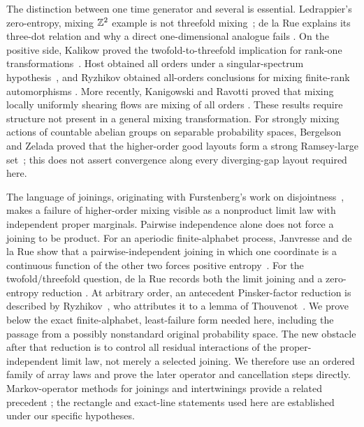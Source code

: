 The distinction between one time generator and several is essential.
Ledrappier's zero-entropy, mixing $\mathbb Z^2$ example is not threefold
mixing~\cite{Ledrappier1978}; de la Rue explains its three-dot relation
and why a direct one-dimensional analogue fails
\cite[Sections~1.2 and~3.4, preprint version]{deLaRue2006}. On the positive side,
Kalikow proved the twofold-to-threefold implication for rank-one
transformations~\cite{Kalikow1984}. Host obtained all orders under a
singular-spectrum hypothesis~\cite{Host1991}, and Ryzhikov obtained
all-orders conclusions for mixing finite-rank automorphisms
\cite{Ryzhikov1993}. More recently, Kanigowski and Ravotti proved
that mixing locally uniformly shearing flows are mixing of all orders
\cite[Theorem~6.8]{KanigowskiRavotti2024}.
These results require structure not present in a general mixing
transformation. For strongly mixing actions of countable abelian groups
on separable probability spaces,
Bergelson and Zelada proved that the higher-order good layouts form a
strong Ramsey-large set~\cite[Theorem~1.11]{BergelsonZelada2024}; this
does not assert convergence along every diverging-gap layout required
here.

The language of joinings, originating with Furstenberg's work on
disjointness~\cite{Furstenberg1967}, makes a failure of higher-order
mixing visible as a nonproduct limit law with independent proper
marginals. Pairwise independence alone does not force a joining to be
product. For an aperiodic finite-alphabet process, Janvresse and
de la Rue show that a pairwise-independent joining in which one
coordinate is a continuous function of the other two forces positive
entropy~\cite{JanvresseDeLaRue2008}.
For the twofold/threefold question, de la Rue records both the limit
joining and a zero-entropy reduction
\cite[Propositions~3.1 and~3.2, preprint version]{deLaRue2006}.
At arbitrary order, an antecedent Pinsker-factor reduction is described
by Ryzhikov~\cite[p.~251]{Ryzhikov1997}, who attributes it to a lemma of
Thouvenot~\cite{Thouvenot1975Pinsker}. We prove below the exact
finite-alphabet, least-failure form needed here, including the passage
from a possibly nonstandard original probability space. The new
obstacle after that reduction is to control all residual interactions
of the proper-independent limit law, not merely a selected joining.
We therefore use an ordered family of array laws and prove the later
operator and cancellation steps directly. Markov-operator methods for
joinings and intertwinings provide a related precedent
\cite{Ryzhikov1994,Ryzhikov1997}; the rectangle and exact-line
statements used here are established under our specific hypotheses.

